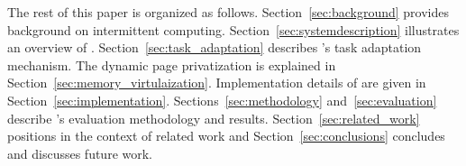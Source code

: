 The rest of this paper is organized as follows. Section~\ref{sec:background} provides background on intermittent computing.
Section~\ref{sec:systemdescription} illustrates an overview of \sys. Section~\ref{sec:task_adaptation} describes \sys's task adaptation mechanism. The dynamic page privatization is explained in Section~\ref{sec:memory_virtulaization}. Implementation details of \sys are given in Section~\ref{sec:implementation}. Sections~\ref{sec:methodology} and~\ref{sec:evaluation} describe \sys's evaluation methodology and results. Section~\ref{sec:related_work} positions \sys in the context of related work and Section~\ref{sec:conclusions} concludes and discusses future work.
